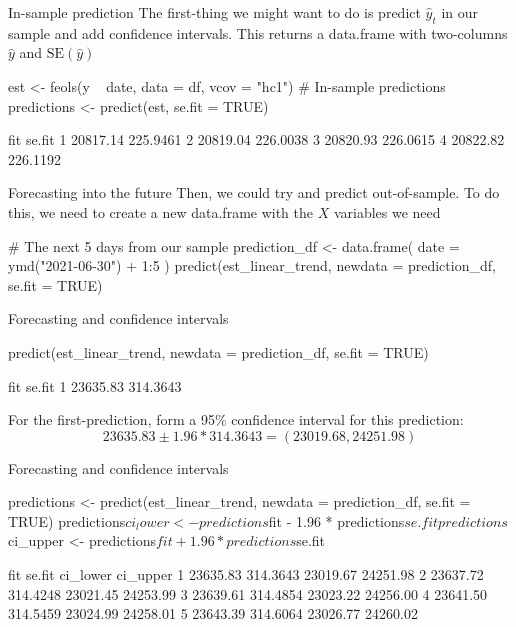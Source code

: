 \documentclass[aspectratio=169,t,11pt,table]{beamer}
\begin{document}
\begin{frame}[fragile]{In-sample prediction}
  The first-thing we might want to do is predict $\hat{y}_t$ in our sample and add confidence intervals. This returns a data.frame with two-columns $\hat{y}$ and $\text{SE}(\hat{y})$
  
  \begin{codeblock}
est <- feols(y ~ date, data = df, vcov = "hc1")
# In-sample predictions
predictions <- predict(est, se.fit = TRUE)
  \end{codeblock}
  \begin{codeblock}[{}]
       fit   se.fit
1 20817.14 225.9461
2 20819.04 226.0038
3 20820.93 226.0615
4 20822.82 226.1192
  \end{codeblock}
\end{frame}

\begin{frame}[fragile]{Forecasting into the future}
  Then, we could try and predict out-of-sample. To do this, we need to create a new data.frame with the $X$ variables we need

  \begin{codeblock}
# The next 5 days from our sample
prediction_df <- data.frame(
  date = ymd("2021-06-30") + 1:5
)
predict(est_linear_trend, newdata = prediction_df, se.fit = TRUE)
  \end{codeblock}
\end{frame}

\begin{frame}[fragile]{Forecasting and confidence intervals}
  \begin{codeblock}
predict(est_linear_trend, newdata = prediction_df, se.fit = TRUE)
  \end{codeblock}
  \begin{codeblock}[{}]
       fit   se.fit
1 23635.83 314.3643
  \end{codeblock}

  For the first-prediction, form a 95\% confidence interval for this prediction:
  \pause
  $$
    23635.83 \pm 1.96 * 314.3643 = (23019.68, 24251.98)
  $$
\end{frame}

\begin{frame}[fragile]{Forecasting and confidence intervals}
  \begin{codeblock}
predictions <- 
  predict(est_linear_trend, newdata = prediction_df, se.fit = TRUE)
predictions$ci_lower <- predictions$fit - 1.96 * predictions$se.fit
predictions$ci_upper <- predictions$fit + 1.96 * predictions$se.fit
  \end{codeblock}

  \begin{codeblock}[{}]
       fit   se.fit ci_lower ci_upper
1 23635.83 314.3643 23019.67 24251.98
2 23637.72 314.4248 23021.45 24253.99
3 23639.61 314.4854 23023.22 24256.00
4 23641.50 314.5459 23024.99 24258.01
5 23643.39 314.6064 23026.77 24260.02
  \end{codeblock}
\end{frame}
\end{document}
